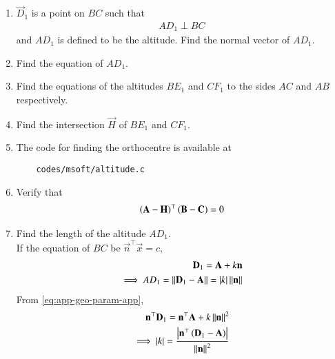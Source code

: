 \begin{enumerate}[label=\thesubsection.\arabic*.,ref=\thesubsection.\theenumi]
\item $\vec{D}_1$ is a point on $BC$ such that
		\begin{align}
			AD_1 \perp BC
		\end{align}
		and $AD_1$ is defined to be the altitude. 
		Find the normal vector of $AD_1$.
  \\
		
	\item Find the equation of $AD_1$.
 \\     

	\item Find the equations of the altitudes $BE_1$ and $CF_1$ to the sides $AC$ and $AB$ respectively. 
  \\     
	\item Find the intersection $\vec{H}$ of $BE_1$ and $CF_1$.
 \\
        
\item 
The code for finding the orthocentre is available at
\begin{lstlisting}
	codes/msoft/altitude.c
\end{lstlisting}
	\item Verify that 
		\begin{align}
			\left(\mathbf{A}-\mathbf{H}\right)^{\top}\left(\mathbf{B}-\mathbf{C}\right) = 0
		\end{align}
  
  \item Find the length of the altitude $AD_1$.
	  \\
		\solution 
		If the equation of $BC$ be $\vec{n}^\top\vec{x} =c$,
\begin{align}
			\label{eq:app-geo-param-app}
	\mathbf{D}_1 = \mathbf{A} + k\mathbf{n}
	\\
	\implies AD_1 = \left\lVert\mathbf{D}_1 - \mathbf{A}\right\rVert=\left\vert k\right\vert \left\lVert\mathbf{n}\right\rVert
			\label{eq:app-geo-param-app-PQ}
\end{align}
			From \eqref{eq:app-geo-param-app},
\begin{align}
	\vec{n}^{\top}  \vec{D}_1 = \vec{n}^{\top}  \vec{A} + k\norm{\vec{n}}^2
	\\
	\implies \abs{k} = 
	\frac{\abs{\vec{n}^{\top}\brak{\vec{D}_1 - \vec{A}}}}{\norm{\vec{n}}^2}
			\label{eq:app-geo-param-app-k}
			\\

\end{align}
\end{enumerate}
